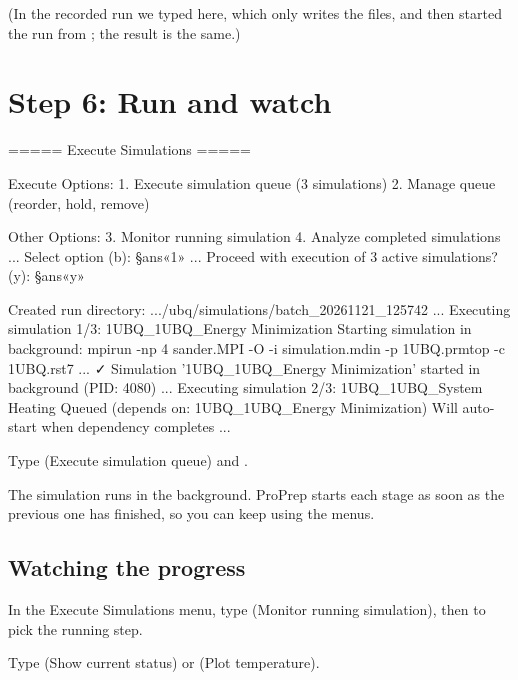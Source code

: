 (In the recorded run we typed  here, which only writes the files, and
then started the run from  \textrightarrow{} ; the result is
the same.)

\section{Step 6: Run and watch}\label{sec:tutorial-run}

\begin{screen}
===== Execute Simulations =====

Execute Options:
  1. Execute simulation queue (3 simulations)
  2. Manage queue (reorder, hold, remove)

Other Options:
  3. Monitor running simulation
  4. Analyze completed simulations
...
Select option (b): §ans«1»
...
Proceed with execution of 3 active simulations? (y): §ans«y»

Created run directory: .../ubq/simulations/batch_20261121_125742
...
Executing simulation 1/3: 1UBQ_1UBQ_Energy Minimization
Starting simulation in background:
mpirun -np 4 sander.MPI -O -i simulation.mdin -p 1UBQ.prmtop -c 1UBQ.rst7 ...
✓ Simulation '1UBQ_1UBQ_Energy Minimization' started in background (PID: 4080)
...
Executing simulation 2/3: 1UBQ_1UBQ_System Heating
  Queued (depends on: 1UBQ_1UBQ_Energy Minimization)
Will auto-start when dependency completes
...
\end{screen}

\begin{steps}
  \item Type  (Execute simulation queue) and .
\end{steps}

The simulation runs in the background. ProPrep starts each stage as soon as
the previous one has finished, so you can keep using the menus.

\subsection{Watching the progress}

\begin{steps}[resume]
  \item In the Execute Simulations menu, type  (Monitor running
        simulation), then  to pick the running step.
  \item Type  (Show current status) or  (Plot temperature).
\end{steps}

